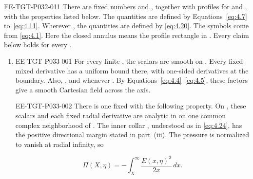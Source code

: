 \begin{theorem}\label{thm:4.6}
\begin{EESegment}{EE-TGT-P032-011}
There are fixed numbers
 and
, together with profiles
 for  and
, with the properties listed below. The
quantities
are defined by Equations~\eqref{eq:4.7} to~\eqref{eq:4.11}. Wherever
, the quantities  are
defined by \eqref{eq:4.20}. The symbols  come from
\eqref{eq:4.1}. Here the closed annulus means the profile rectangle
 in
. Every claim below holds for every
.
\end{EESegment}
\begin{enumerate}[label=(\roman*)]
%
\item
\begin{EESegment}{EE-TGT-P033-001}
For every finite , the scalars
 are smooth on
. Every fixed mixed
 derivative has a uniform bound there, with
one-sided derivatives at the boundary. Also, ,
and  whenever
. By Equations~\eqref{eq:4.4}--\eqref{eq:4.5}, these
factors give a smooth Cartesian field across the axis.
\end{EESegment}

\begin{EESegment}{EE-TGT-P033-002}
There is one fixed  with the
following property. On
, these scalars and each
fixed radial derivative are analytic in  on one
common complex neighborhood of . The inner collar
, understood as in
\eqref{eq:4.24}, has the positive directional margin stated in part~(iii).
The pressure is normalized to vanish at radial infinity, so
\end{EESegment}
\begin{equation}
  \Pi(X,\eta)=-\int_X^\infty\frac{E(x,\eta)^2}{2x}\,dx.
  \tag{4.25}\label{eq:4.25}
\end{equation}


\end{enumerate}
\end{theorem}
